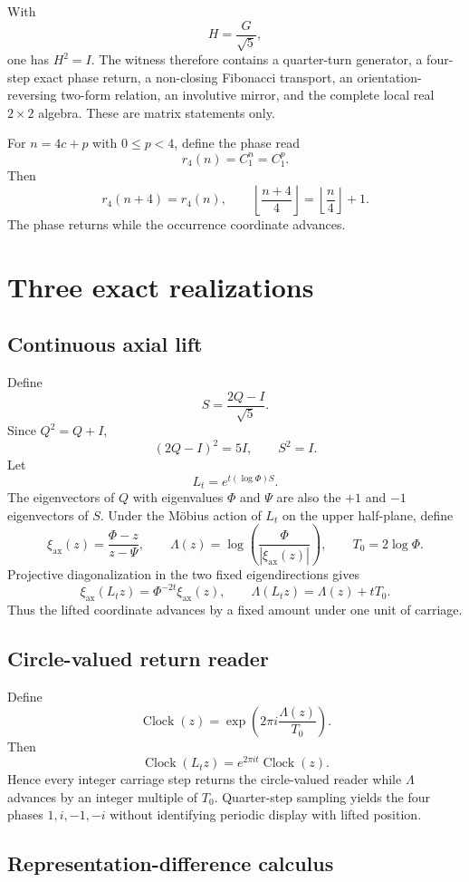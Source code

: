 \documentclass[11pt]{article}
\newcommand{\Clock}{\operatorname{Clock}}
\begin{document}
With
\[
H=\frac{G}{\sqrt5},
\]
one has $H^2=I$. The witness therefore contains a quarter-turn generator, a four-step exact phase return, a non-closing Fibonacci transport, an orientation-reversing two-form relation, an involutive mirror, and the complete local real $2\times2$ algebra. These are matrix statements only.

For $n=4c+p$ with $0\le p<4$, define the phase read
\[
r_4(n)=C_1^n=C_1^p.
\]
Then
\[
r_4(n+4)=r_4(n),
\qquad
\left\lfloor\frac{n+4}{4}\right\rfloor
=
\left\lfloor\frac n4\right\rfloor+1.
\]
The phase returns while the occurrence coordinate advances.

\section{Three exact realizations}

\subsection*{Continuous axial lift}

Define
\[
S=\frac{2Q-I}{\sqrt5}.
\]
Since $Q^2=Q+I$,
\[
(2Q-I)^2=5I,
\qquad
S^2=I.
\]
Let
\[
L_t=e^{t(\log\Phi)S}.
\]
The eigenvectors of $Q$ with eigenvalues $\Phi$ and $\Psi$ are also the $+1$ and $-1$ eigenvectors of $S$. Under the M\"obius action of $L_t$ on the upper half-plane, define
\[
\xi_{\mathrm{ax}}(z)=\frac{\Phi-z}{z-\Psi},
\qquad
\Lambda(z)=\log\!\left(\frac{\Phi}{|\xi_{\mathrm{ax}}(z)|}\right),
\qquad
T_0=2\log\Phi.
\]
Projective diagonalization in the two fixed eigendirections gives
\[
\boxed{
\xi_{\mathrm{ax}}(L_tz)=\Phi^{-2t}\xi_{\mathrm{ax}}(z),
\qquad
\Lambda(L_tz)=\Lambda(z)+tT_0.
}
\]
Thus the lifted coordinate advances by a fixed amount under one unit of carriage.

\subsection*{Circle-valued return reader}

Define
\[
\Clock(z)=
\exp\!\left(2\pi i\frac{\Lambda(z)}{T_0}\right).
\]
Then
\[
\boxed{
\Clock(L_tz)=e^{2\pi i t}\Clock(z).
}
\]
Hence every integer carriage step returns the circle-valued reader while $\Lambda$ advances by an integer multiple of $T_0$. Quarter-step sampling yields the four phases $1,i,-1,-i$ without identifying periodic display with lifted position.

\subsection*{Representation-difference calculus}
\end{document}
